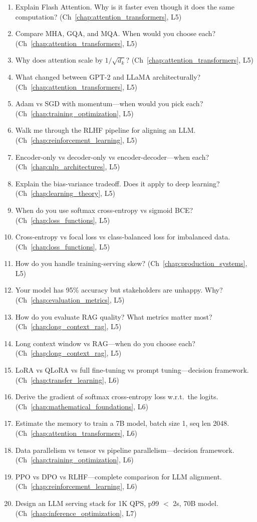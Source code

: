 \begin{enumerate}
    \item Explain Flash Attention. Why is it faster even though it does the same computation? (Ch~\ref{chap:attention_transformers}, L5)
    \item Compare MHA, GQA, and MQA. When would you choose each? (Ch~\ref{chap:attention_transformers}, L5)
    \item Why does attention scale by $1/\sqrt{d_k}$? (Ch~\ref{chap:attention_transformers}, L5)
    \item What changed between GPT-2 and LLaMA architecturally? (Ch~\ref{chap:attention_transformers}, L5)
    \item Adam vs SGD with momentum---when would you pick each? (Ch~\ref{chap:training_optimization}, L5)
    \item Walk me through the RLHF pipeline for aligning an LLM. (Ch~\ref{chap:reinforcement_learning}, L5)
    \item Encoder-only vs decoder-only vs encoder-decoder---when each? (Ch~\ref{chap:nlp_architectures}, L5)
    \item Explain the bias-variance tradeoff. Does it apply to deep learning? (Ch~\ref{chap:learning_theory}, L5)
    \item When do you use softmax cross-entropy vs sigmoid BCE? (Ch~\ref{chap:loss_functions}, L5)
    \item Cross-entropy vs focal loss vs class-balanced loss for imbalanced data. (Ch~\ref{chap:loss_functions}, L5)
    \item How do you handle training-serving skew? (Ch~\ref{chap:production_systems}, L5)
    \item Your model has 95\% accuracy but stakeholders are unhappy. Why? (Ch~\ref{chap:evaluation_metrics}, L5)
    \item How do you evaluate RAG quality? What metrics matter most? (Ch~\ref{chap:long_context_rag}, L5)
    \item Long context window vs RAG---when do you choose each? (Ch~\ref{chap:long_context_rag}, L5)
    \item LoRA vs QLoRA vs full fine-tuning vs prompt tuning---decision framework. (Ch~\ref{chap:transfer_learning}, L6)
    \item Derive the gradient of softmax cross-entropy loss w.r.t.\ the logits. (Ch~\ref{chap:mathematical_foundations}, L6)
    \item Estimate the memory to train a 7B model, batch size 1, seq len 2048. (Ch~\ref{chap:attention_transformers}, L6)
    \item Data parallelism vs tensor vs pipeline parallelism---decision framework. (Ch~\ref{chap:training_optimization}, L6)
    \item PPO vs DPO vs RLHF---complete comparison for LLM alignment. (Ch~\ref{chap:reinforcement_learning}, L6)
    \item Design an LLM serving stack for 1K QPS, p99 $<$ 2s, 70B model. (Ch~\ref{chap:inference_optimization}, L7)
\end{enumerate}

